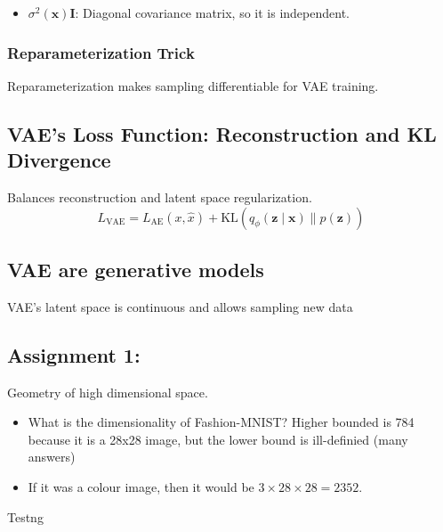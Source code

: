 \documentclass{article}
\begin{document}
\begin{notes}
    \begin{itemize}
        \item $\sigma^2(\mathbf{x}) \mathbf{I}$: Diagonal covariance matrix, so it is independent.
    \end{itemize}
\end{notes}

\subsubsection{Reparameterization Trick}
\begin{definition}
    Reparameterization makes sampling differentiable for VAE training.
\end{definition}

\subsection{VAE's Loss Function: Reconstruction and KL Divergence}
\begin{definition}
    Balances reconstruction and latent space regularization.
    \begin{equation}
        L_{\text{VAE}} = L_{\text{AE}} (x, \hat{x}) + \text{KL} (q_\phi (\mathbf{z} \mid \mathbf{x}) \parallel p(\mathbf{z}))
    \end{equation}
\end{definition}

\subsection{VAE are generative models}
\begin{definition}
    VAE's latent space is continuous and allows sampling new data
\end{definition}

\subsection{Assignment 1:}
\begin{definition}
    Geometry of high dimensional space. 
\end{definition}

\begin{notes}
    \begin{itemize}
        \item What is the dimensionality of Fashion-MNIST? Higher bounded is 784 because it is a 28x28 image, but the lower bound is ill-definied (many answers)
        \item If it was a colour image, then it would be $3 \times 28 \times 28 = 2352$.
    \end{itemize}
\end{notes}

Testng
\end{document}
